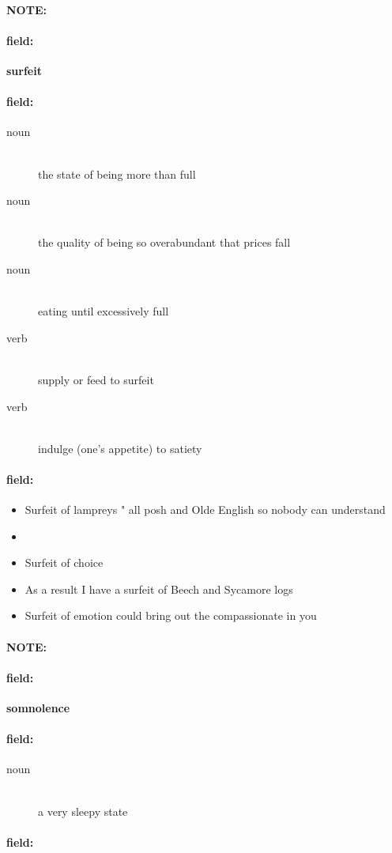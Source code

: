\documentclass[12pt]{article}
\newenvironment{note}{\paragraph{NOTE:}}{}
\newenvironment{field}{\paragraph{field:}}{}
\begin{document}
\begin{note}
\begin{field}
\textbf{\large surfeit}
\end{field}


\begin{field}
\begin{description}
\item[noun] \hfill \\ 
the state of being more than full

\item[noun] \hfill \\ 
the quality of being so overabundant that prices fall

\item[noun] \hfill \\ 
eating until excessively full

\item[verb] \hfill \\ 
supply or feed to surfeit

\item[verb] \hfill \\ 
indulge (one's appetite) to satiety

\end{description}
\end{field}

\begin{field}
\begin{itemize}
\item Surfeit of lampreys " all posh and Olde English so nobody can understand
\item 
\item Surfeit of choice
\item As a result I have a surfeit of Beech and Sycamore logs
\item Surfeit of emotion could bring out the compassionate in you
\end{itemize}
\end{field}
\end{note}
\begin{note}
\begin{field}
\textbf{\large somnolence}
\end{field}


\begin{field}
\begin{description}
\item[noun] \hfill \\ 
a very sleepy state

\end{description}
\end{field}

\begin{field}
\end{field}
\end{note}
\end{document}
